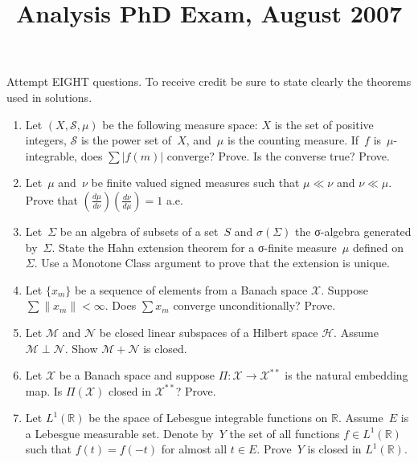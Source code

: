 \documentclass[11pt,letterpaper]{article}
\title{Analysis PhD Exam, August 2007}
\author{}
\date{}
\newenvironment{examproblems}[2]{%
  \def\ProblemHeadingTag{#2}%
  \AssignTaggingSocketPlug{block/list/label}{examproblem}%
  \begin{enumerate}%
  \setcounter{enumi}{#1}%
  \renewcommand{\labelenumi}{\textbf{\theenumi.}}%
  \setlength{\topsep}{0.35em}%
  \setlength{\partopsep}{0pt}%
  \setlength{\itemsep}{0.48em}%
  \setlength{\parsep}{0.18em}%
}{\end{enumerate}}
\newenvironment{examinstructions}{%
  \par\begingroup\itshape
}{%
  \par\endgroup\vspace{0.18em}
}
\begin{document}
\maketitle
\thispagestyle{empty}
\begin{examinstructions}
Attempt EIGHT questions. To receive credit be sure to state clearly the theorems used in solutions.
\end{examinstructions}
\begin{examproblems}{0}{H2}
\def\ProblemHeadingText{Problem 1.}
\item
Let \((X,\mathcal S,\mu)\) be the following measure space: \(X\) is the set of positive integers, \(\mathcal S\) is the power set of~\(X\), and~\(\mu\) is the counting measure. If~\(f\) is~\(\mu\)-integrable, does \(\sum |f(m)|\) converge? Prove. Is the converse true? Prove.
\def\ProblemHeadingText{Problem 2.}
\item
Let~\(\mu\) and~\(\nu\) be finite valued signed measures such that \(\mu\ll\nu\) and \(\nu\ll\mu\). Prove that \(\left(\frac{d\mu}{d\nu}\right)\left(\frac{d\nu}{d\mu}\right)=1\) a.e.
\def\ProblemHeadingText{Problem 3.}
\item
Let~\(\Sigma\) be an algebra of subsets of a set~\(S\) and \(\sigma(\Sigma)\) the σ-algebra generated by~\(\Sigma\). State the Hahn extension theorem for a σ-finite measure~\(\mu\) defined on~\(\Sigma\). Use a Monotone Class argument to prove that the extension is unique.
\def\ProblemHeadingText{Problem 4.}
\item
Let \(\{x_m\}\) be a sequence of elements from a Banach space \(\mathcal X\). Suppose \(\sum \|x_m\|<\infty\). Does \(\sum x_m\) converge unconditionally? Prove.
\def\ProblemHeadingText{Problem 5.}
\item
Let \(\mathcal M\) and \(\mathcal N\) be closed linear subspaces of a Hilbert space \(\mathcal H\). Assume \(\mathcal M\perp\mathcal N\). Show \(\mathcal M+\mathcal N\) is closed.
\def\ProblemHeadingText{Problem 6.}
\item
Let \(\mathcal X\) be a Banach space and suppose \(\Pi:\mathcal X\to\mathcal X^{**}\) is the natural embedding map. Is \(\Pi(\mathcal X)\) closed in \(\mathcal X^{**}\)? Prove.
\def\ProblemHeadingText{Problem 7.}
\item
Let \(L^1(\mathbb R)\) be the space of Lebesgue integrable functions on \(\mathbb R\). Assume~\(E\) is a Lebesgue measurable set. Denote by~\(Y\) the set of all functions \(f\in L^1(\mathbb R)\) such that \(f(t)=f(-t)\) for almost all \(t\in E\). Prove~\(Y\) is closed in \(L^1(\mathbb R)\).

\end{examproblems}
\end{document}
